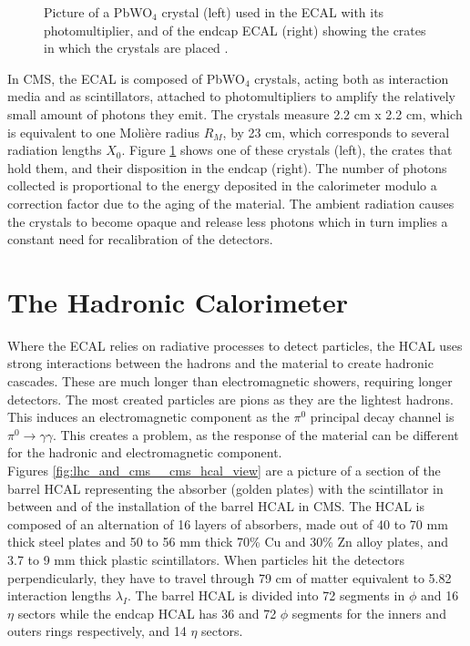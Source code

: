   \begin{figure}[h!]
    \centering
    \caption{Picture of a PbWO$ _4 $ crystal (left) used in the ECAL with its photomultiplier, and of the endcap ECAL (right) showing the crates in which the crystals are placed \Cite{CMS_at_LHC}.}
    \label{fig:lhc_and_cms__cms_ecal_view}
  \end{figure}

  In CMS, the ECAL is composed of PbWO$ _4 $ crystals, acting both as interaction media and as scintillators, attached to photomultipliers to amplify the relatively small amount of photons they emit. The crystals measure 2.2 cm x 2.2 cm, which is equivalent to one Molière radius $ R_M $, by 23 cm, which corresponds to several radiation lengths $ X_0 $. Figure \ref{fig:lhc_and_cms__cms_ecal_view} shows one of these crystals (left), the crates that hold them, and their disposition in the endcap (right). The number of photons collected is proportional to the energy deposited in the calorimeter modulo a correction factor due to the aging of the material. The ambient radiation causes the crystals to become opaque and release less photons which in turn implies a constant need for recalibration of the detectors.

  \section{The Hadronic Calorimeter}

  Where the ECAL relies on radiative processes to detect particles, the HCAL uses strong interactions between the hadrons and the material to create hadronic cascades. These are much longer than electromagnetic showers, requiring longer detectors. The most created particles are pions as they are the lightest hadrons. This induces an electromagnetic component as the $ \pi^0 $ principal decay channel is $ \pi^0 \rightarrow \gamma \gamma $. This creates a problem, as the response of the material can be different for the hadronic and electromagnetic component. \\

  Figures \ref{fig:lhc_and_cms__cms_hcal_view} are a picture of a section of the barrel HCAL representing the absorber (golden plates) with the scintillator in between and of the installation of the barrel HCAL in CMS. The HCAL is composed of an alternation of 16 layers of absorbers, made out of 40 to 70 mm thick steel plates and 50 to 56 mm thick 70\% Cu and 30\% Zn alloy plates, and 3.7 to 9 mm thick plastic scintillators. When particles hit the detectors perpendicularly, they have to travel through 79 cm of matter equivalent to 5.82 interaction lengths $ \lambda_I $. The barrel HCAL is divided into 72 segments in $ \phi $ and 16 $ \eta $ sectors while the endcap HCAL has 36 and 72 $ \phi $ segments for the inners and outers rings respectively, and 14 $ \eta $ sectors.

